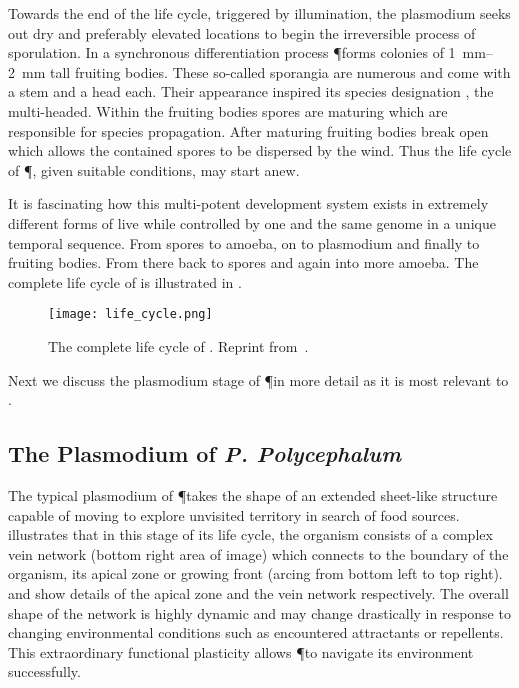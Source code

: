		Towards the end of the life cycle, triggered by illumination, the plasmodium seeks out dry and preferably elevated locations to begin the irreversible process of sporulation. In a synchronous differentiation process \P forms colonies of \SIrange{1}{2}{\milli\metre} tall fruiting bodies. These so-called sporangia are numerous and come with a stem and a head each. Their appearance inspired its species designation \Pp, the multi-headed. Within the fruiting bodies spores are maturing which are responsible for species propagation. After maturing fruiting bodies break open which allows the contained spores to be dispersed by the wind. Thus the life cycle of \P, given suitable conditions, may start anew.

		It is fascinating how this multi-potent development system exists in extremely different forms of live while controlled by one and the same genome in a unique temporal sequence. From spores to amoeba, on to plasmodium and finally to fruiting bodies. From there back to spores and again into more amoeba. The complete life cycle of \Pp is illustrated in .

		\begin{figure}[htb]
			\centering
			\texttt{[image: life\_cycle.png]}
			\caption[Life cycle of \P]{The complete life cycle of \Pp. Reprint from~\cite{Sauer1986}.}
			\label{fig:life_cycle}
		\end{figure}

		Next we discuss the plasmodium stage of \P in more detail as it is most relevant to .

		\FloatBarrier

	\subsection{The Plasmodium of \textit{P. Polycephalum}}

		The typical plasmodium of \P takes the shape of an extended sheet-like structure capable of moving to explore unvisited territory in search of food sources.  illustrates that in this stage of its life cycle, the organism consists of a complex vein network (bottom right area of image) which connects to the boundary of the organism, its apical zone or growing front (arcing from bottom left to top right).  and  show details of the apical zone and the vein network respectively. The overall shape of the network is highly dynamic and may change drastically in response to changing environmental conditions such as encountered attractants or repellents. This extraordinary functional plasticity allows \P to navigate its environment successfully.

